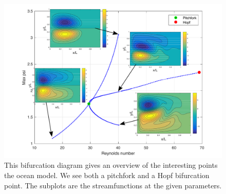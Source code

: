 \documentclass[a4paper,10pt]{article}
\begin{document}
  \maketitle

  \begin{figure}[b!]
  \centerline{\includegraphics[width=1.3\textwidth]{images/bifurcatie_met_plots.pdf}}
  \caption{This bifurcation diagram gives an overview of the interesting points the ocean model. We see both a pitchfork and a Hopf bifurcation point. The subplots are the streamfunctions at the given parameters.}\label{fig:bifurcation_diagram}
  \end{figure}

  


  

  

  

  
  
  

  
  
  
\end{document}
